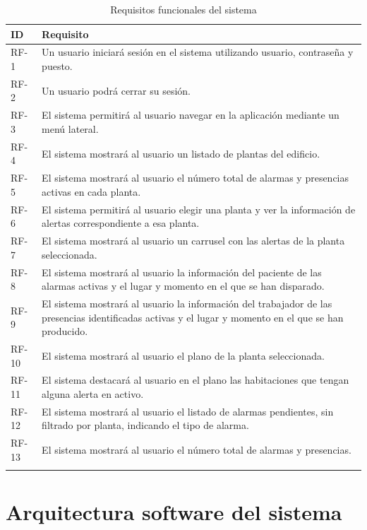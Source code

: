 \begin{longtable}{|p{1cm}|p{14cm}|}
	\hline
	\textbf{ID} & \textbf{Requisito} \\
	\hline
	RF-1 	& 	Un usuario iniciará sesión en el sistema utilizando usuario, contraseña y puesto. \\
	\hline
	RF-2	&	Un usuario podrá cerrar su sesión.	\\
	\hline
	RF-3	&	El sistema permitirá al usuario navegar en la aplicación mediante un menú lateral. \\
	\hline
	RF-4	&	El sistema mostrará al usuario un listado de plantas del edificio. \\
	\hline
	RF-5	&	El sistema mostrará al usuario el número total de alarmas y presencias activas en cada planta. \\
	\hline
	RF-6	&	El sistema permitirá al usuario elegir una planta y ver la información de alertas correspondiente a esa planta. \\
	\hline
	RF-7	&	El sistema mostrará al usuario un carrusel con las alertas de la planta seleccionada. \\
	\hline
	RF-8	&	El sistema mostrará al usuario la información del paciente de las alarmas activas y el lugar y momento en el que se han disparado. \\
	\hline
	RF-9	&	El sistema mostrará al usuario la información del trabajador de las presencias identificadas activas y el lugar y momento en el que se han producido. \\
	\hline
	RF-10	&	El sistema mostrará al usuario el plano de la planta seleccionada. \\
	\hline
	RF-11	&	El sistema destacará al usuario en el plano las habitaciones que tengan alguna alerta en activo. \\
	\hline
	RF-12	&	El sistema mostrará al usuario el listado de alarmas pendientes, sin filtrado por planta, indicando el tipo de alarma. \\
	\hline
	RF-13	&	El sistema mostrará al usuario el número total de alarmas y presencias. \\
	\hline
\caption{Requisitos funcionales del sistema}
\label{tab:etiqueta_tabla}
\end{longtable}

\section{Arquitectura software del sistema}

